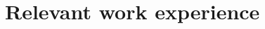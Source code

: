 \documentclass[11pt]{article}
\begin{document}


\section*{Relevant work experience}
\end{document}
